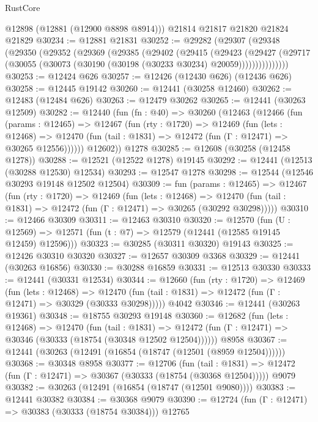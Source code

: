 \begin{lexlean}{RustCore}
\begin{coremodule}
      @12898
      (@12881 (@12900 @8898 @8914)))
    @21814
    @21817
    @21820
    @21824
    @21829
@30234 := @12881 @21831
@30252 := @29282
    (@29307
      (@29348
        (@29350
          (@29352
            (@29369
              (@29385
                (@29402
                  (@29415
                    (@29423
                      (@29427
                        (@29717
                          (@30055 (@30073 (@30190 (@30198 (@30233 @30234) @20059)))))))))))))))
@30253 := @12424 @626
@30257 := @12426 (@12430 @626) (@12436 @626)
@30258 := @12445 @19142
@30260 := @12441 (@30258 @12460)
@30262 := @12483 (@12484 @626)
@30263 := @12479 @30262
@30265 := @12441 (@30263 @12509)
@30282 := @12440
    (fun (fn : @40) =>
    @30260
      (@12463
        (@12466
          (fun (params : @12465) =>
          @12467
            (fun (rty : @1720) =>
            @12469
              (fun (lets : @12468) =>
              @12470 (fun (tail : @1831) => @12472 (fun (Γ : @12471) => @30265 @12556))))))
        @12602))
    @1278
@30285 := @12608 (@30258 (@12458 @1278))
@30288 := @12521 (@12522 @1278) @19145
@30292 := @12441 (@12513 (@30288 @12530) @12534)
@30293 := @12547 @1278
@30298 := @12544 (@12546 @30293 @19148 @12502 @12504)
@30309 := fun (params : @12465) =>
  @12467
    (fun (rty : @1720) =>
    @12469
      (fun (lets : @12468) =>
      @12470 (fun (tail : @1831) => @12472 (fun (Γ : @12471) => @30265 (@30292 @30298)))))
@30310 := @12466 @30309
@30311 := @12463 @30310
@30320 := @12570
    (fun (U : @12569) => @12571 (fun (t : @7) => @12579 (@12441 (@12585 @19145 @12459) @12596)))
@30323 := @30285 (@30311 @30320) @19143
@30325 := @12426 @30310 @30320
@30327 := @12657 @30309 @3368
@30329 := @12441 (@30263 @16856)
@30330 := @30288 @16859
@30331 := @12513 @30330
@30333 := @12441 (@30331 @12534)
@30344 := @12660
    (fun (rty : @1720) =>
    @12469
      (fun (lets : @12468) =>
      @12470 (fun (tail : @1831) => @12472 (fun (Γ : @12471) => @30329 (@30333 @30298)))))
    @4042
@30346 := @12441 (@30263 @19361)
@30348 := @18755 @30293 @19148
@30360 := @12682
    (fun (lets : @12468) =>
    @12470
      (fun (tail : @1831) =>
      @12472 (fun (Γ : @12471) => @30346 (@30333 (@18754 (@30348 @12502 @12504))))))
    @8958
@30367 := @12441 (@30263 (@12491 (@16854 (@18747 (@12501 (@8959 @12504))))))
@30368 := @30348 @8958
@30377 := @12706
    (fun (tail : @1831) => @12472 (fun (Γ : @12471) => @30367 (@30333 (@18754 (@30368 @12504)))))
    @9079
@30382 := @30263 (@12491 (@16854 (@18747 (@12501 @9080))))
@30383 := @12441 @30382
@30384 := @30368 @9079
@30390 := @12724 (fun (Γ : @12471) => @30383 (@30333 (@18754 @30384))) @12765

\end{coremodule}
\end{lexlean}

